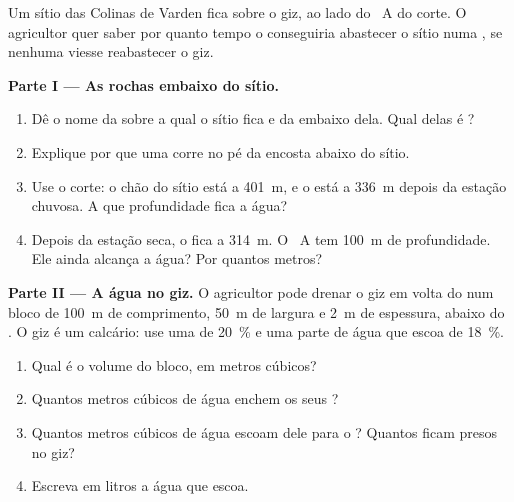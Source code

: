 \begin{problem}
\label{pb:g6:water-underground:1}
Um sítio das Colinas de Varden fica sobre o giz, ao lado do ~A do
corte. O agricultor quer saber por quanto tempo o  conseguiria
abastecer o sítio numa , se nenhuma  viesse reabastecer
o giz.

\medskip
\noindent\textbf{Parte I --- As rochas embaixo do sítio.}
\begin{enumerate}
  \item Dê o nome da  sobre a qual o sítio fica e da  embaixo
        dela. Qual delas é ?
  \item Explique por que uma  corre no pé da encosta abaixo do sítio.
  \item Use o corte: o chão do sítio está a 401~m, e o 
        está a 336~m depois da estação chuvosa. A que profundidade fica a
        água?
  \item Depois da estação seca, o  fica a 314~m. O ~A
        tem 100~m de profundidade. Ele ainda alcança a água? Por quantos
        metros?
\end{enumerate}

\medskip
\noindent\textbf{Parte II --- A água no giz.}
O agricultor pode drenar o giz em volta do  num bloco de 100~m de
comprimento, 50~m de largura e 2~m de espessura, abaixo do . O giz é um calcário: use uma  de 20~\% e uma parte de
água que escoa de 18~\%.
\begin{enumerate}[resume]
  \item Qual é o volume do bloco, em metros cúbicos?
  \item Quantos metros cúbicos de água enchem os seus ?
  \item Quantos metros cúbicos de água escoam dele para o ? Quantos
        ficam presos no giz?
  \item Escreva em litros a água que escoa.
\end{enumerate}


\end{problem}
